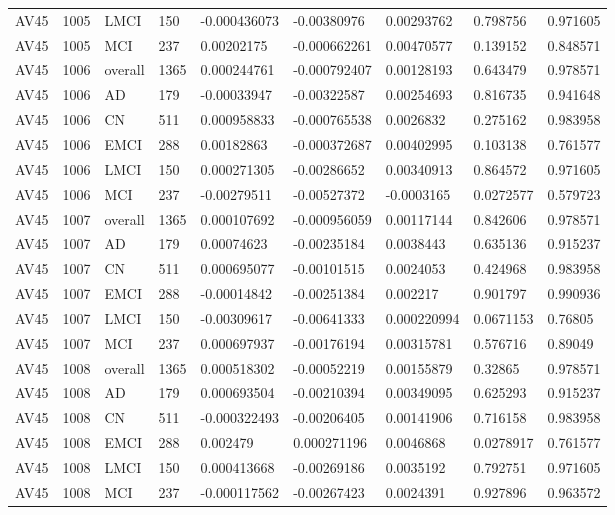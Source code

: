\begin{landscape}
\begin{longtable}{lllllllll}
AV45 & 1005 & LMCI & 150 & -0.000436073 & -0.00380976 & 0.00293762 & 0.798756 & 0.971605 \\
AV45 & 1005 & MCI & 237 & 0.00202175 & -0.000662261 & 0.00470577 & 0.139152 & 0.848571 \\
AV45 & 1006 & overall & 1365 & 0.000244761 & -0.000792407 & 0.00128193 & 0.643479 & 0.978571 \\
AV45 & 1006 & AD & 179 & -0.00033947 & -0.00322587 & 0.00254693 & 0.816735 & 0.941648 \\
AV45 & 1006 & CN & 511 & 0.000958833 & -0.000765538 & 0.0026832 & 0.275162 & 0.983958 \\
AV45 & 1006 & EMCI & 288 & 0.00182863 & -0.000372687 & 0.00402995 & 0.103138 & 0.761577 \\
AV45 & 1006 & LMCI & 150 & 0.000271305 & -0.00286652 & 0.00340913 & 0.864572 & 0.971605 \\
AV45 & 1006 & MCI & 237 & -0.00279511 & -0.00527372 & -0.0003165 & 0.0272577 & 0.579723 \\
AV45 & 1007 & overall & 1365 & 0.000107692 & -0.000956059 & 0.00117144 & 0.842606 & 0.978571 \\
AV45 & 1007 & AD & 179 & 0.00074623 & -0.00235184 & 0.0038443 & 0.635136 & 0.915237 \\
AV45 & 1007 & CN & 511 & 0.000695077 & -0.00101515 & 0.0024053 & 0.424968 & 0.983958 \\
AV45 & 1007 & EMCI & 288 & -0.00014842 & -0.00251384 & 0.002217 & 0.901797 & 0.990936 \\
AV45 & 1007 & LMCI & 150 & -0.00309617 & -0.00641333 & 0.000220994 & 0.0671153 & 0.76805 \\
AV45 & 1007 & MCI & 237 & 0.000697937 & -0.00176194 & 0.00315781 & 0.576716 & 0.89049 \\
AV45 & 1008 & overall & 1365 & 0.000518302 & -0.00052219 & 0.00155879 & 0.32865 & 0.978571 \\
AV45 & 1008 & AD & 179 & 0.000693504 & -0.00210394 & 0.00349095 & 0.625293 & 0.915237 \\
AV45 & 1008 & CN & 511 & -0.000322493 & -0.00206405 & 0.00141906 & 0.716158 & 0.983958 \\
AV45 & 1008 & EMCI & 288 & 0.002479 & 0.000271196 & 0.0046868 & 0.0278917 & 0.761577 \\
AV45 & 1008 & LMCI & 150 & 0.000413668 & -0.00269186 & 0.0035192 & 0.792751 & 0.971605 \\
AV45 & 1008 & MCI & 237 & -0.000117562 & -0.00267423 & 0.0024391 & 0.927896 & 0.963572 \\

\end{longtable}
\end{landscape}

